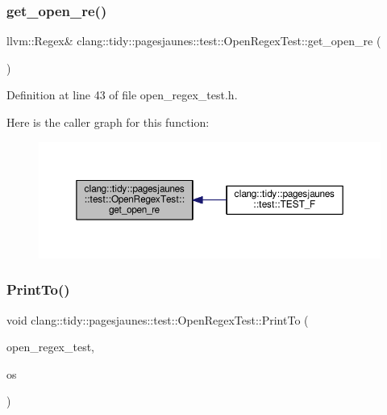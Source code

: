 \subsubsection{\texorpdfstring{get\+\_\+open\+\_\+re()}{get\_open\_re()}}
{\footnotesize\ttfamily llvm\+::\+Regex\& clang\+::tidy\+::pagesjaunes\+::test\+::\+Open\+Regex\+Test\+::get\+\_\+open\+\_\+re (\begin{DoxyParamCaption}{ }\end{DoxyParamCaption})\hspace{0.3cm}{\ttfamily [inline]}}



Definition at line 43 of file open\+\_\+regex\+\_\+test.\+h.

Here is the caller graph for this function\+:
\nopagebreak
\begin{figure}[H]
\begin{center}
\leavevmode
\includegraphics[width=350pt]{classclang_1_1tidy_1_1pagesjaunes_1_1test_1_1_open_regex_test_a6ff695054d66cd4411d9fae421abccd1_icgraph}
\end{center}
\end{figure}
\mbox{\label{classclang_1_1tidy_1_1pagesjaunes_1_1test_1_1_open_regex_test_a9ce37b59921fd03e11ab578196ed27c4}} 
\subsubsection{\texorpdfstring{Print\+To()}{PrintTo()}}
{\footnotesize\ttfamily void clang\+::tidy\+::pagesjaunes\+::test\+::\+Open\+Regex\+Test\+::\+Print\+To (\begin{DoxyParamCaption}\item[{const \hyperlink{classclang_1_1tidy_1_1pagesjaunes_1_1test_1_1_open_regex_test}{Open\+Regex\+Test} \&}]{open\+\_\+regex\+\_\+test,  }\item[{\+::std\+::ostream $\ast$}]{os }\end{DoxyParamCaption})}



